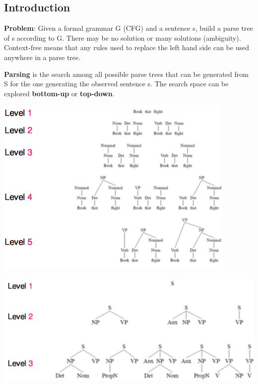 
\subsection{Introduction}

\textbf{Problem}: Given a formal grammar G (CFG) and a sentence s, build a parse tree of s according to G. There may be no solution or many solutions (ambiguity). Context-free means that any rules used to replace the left hand side can be used anywhere in a parse tree.

\textbf{Parsing} is the search among all possible parse trees that can be generated from S for the one generating the observed sentence s. The search space can be explored \textbf{bottom-up} or \textbf{top-down}.
\\ 
\noindent
\begin{minipage}{.5\textwidth}
	\centering
	\includegraphics[scale=0.4]{images/43_bottom-up.png}
\end{minipage}%
\begin{minipage}{.5\textwidth}
	\centering
	\includegraphics[scale=0.4]{images/44_top-down.png}
\end{minipage}

